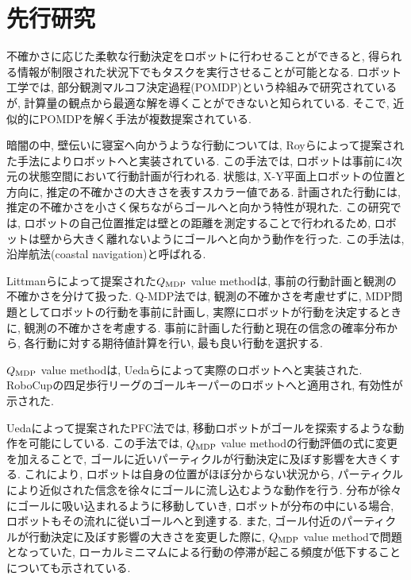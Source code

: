 \section{先行研究}

不確かさに応じた柔軟な行動決定をロボットに行わせることができると, 得られる情報が制限された状況下でもタスクを実行させることが可能となる. 
ロボット工学では, 部分観測マルコフ決定過程(POMDP)という枠組みで研究されているが, 計算量の観点から最適な解を導くことができないと知られている\cite{kaelbling1998}. 
そこで, 近似的にPOMDPを解く手法が複数提案されている. 

暗闇の中, 壁伝いに寝室へ向かうような行動については, Royらによって提案された手法によりロボットへと実装されている\cite{roy1999b}. 
この手法では, ロボットは事前に4次元の状態空間において行動計画が行われる. 
状態は, X-Y平面上ロボットの位置と方向に, 推定の不確かさの大きさを表すスカラー値である. 
計画された行動には, 推定の不確かさを小さく保ちながらゴールへと向かう特性が現れた. 
この研究では, ロボットの自己位置推定は壁との距離を測定することで行われるため, ロボットは壁から大きく離れないようにゴールへと向かう動作を行った. 
この手法は, 沿岸航法(coastal navigation)と呼ばれる. 

Littmanらによって提案された$Q_{\rm MDP}$ value method\cite{littman1995}は, 事前の行動計画と観測の不確かさを分けて扱った. 
Q-MDP法では, 観測の不確かさを考慮せずに, MDP問題としてロボットの行動を事前に計画し, 
実際にロボットが行動を決定するときに, 観測の不確かさを考慮する. 
事前に計画した行動と現在の信念の確率分布から, 各行動に対する期待値計算を行い, 最も良い行動を選択する. 

$Q_{\rm MDP}$ value methodは, Uedaらによって実際のロボットへと実装された\cite{ueda2003iros}. 
RoboCupの四足歩行リーグのゴールキーパーのロボットへと適用され, 有効性が示された. 

Uedaによって提案されたPFC法では, 移動ロボットがゴールを探索するような動作を可能にしている\cite{ueda2015}. 
この手法では, $Q_{\rm MDP}$ value methodの行動評価の式に変更を加えることで, ゴールに近いパーティクルが行動決定に及ぼす影響を大きくする. 
これにより, ロボットは自身の位置がほぼ分からない状況から, パーティクルにより近似された信念を徐々にゴールに流し込むような動作を行う. 
分布が徐々にゴールに吸い込まれるように移動していき, ロボットが分布の中にいる場合, ロボットもその流れに従いゴールへと到達する. 
また, ゴール付近のパーティクルが行動決定に及ぼす影響の大きさを変更した際に, 
$Q_{\rm MDP}$ value methodで問題となっていた, ローカルミニマムによる行動の停滞が起こる頻度が低下することについても示されている\cite{ueda2018searching}. 

